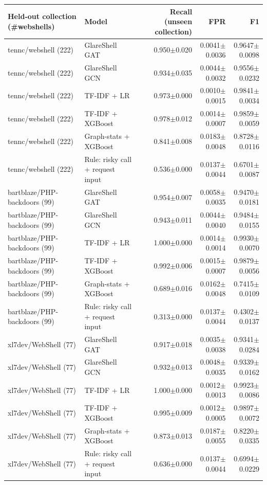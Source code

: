 \begin{tabular}{@{}llrrr@{}}
\toprule
Held-out collection (\#webshells) & Model & Recall (unseen collection) & FPR & F1 \\ \midrule
tennc/webshell (222) & GlareShell GAT & 0.950$\pm$0.020 & 0.0041$\pm$0.0036 & 0.9647$\pm$0.0098 \\
tennc/webshell (222) & GlareShell GCN & 0.934$\pm$0.035 & 0.0044$\pm$0.0032 & 0.9556$\pm$0.0232 \\
tennc/webshell (222) & TF-IDF + LR & 0.973$\pm$0.000 & 0.0010$\pm$0.0015 & 0.9841$\pm$0.0034 \\
tennc/webshell (222) & TF-IDF + XGBoost & 0.978$\pm$0.012 & 0.0014$\pm$0.0007 & 0.9859$\pm$0.0059 \\
tennc/webshell (222) & Graph-stats + XGBoost & 0.841$\pm$0.008 & 0.0183$\pm$0.0048 & 0.8728$\pm$0.0116 \\
tennc/webshell (222) & Rule: risky call + request input & 0.536$\pm$0.000 & 0.0137$\pm$0.0044 & 0.6701$\pm$0.0087 \\
bartblaze/PHP-backdoors (99) & GlareShell GAT & 0.954$\pm$0.007 & 0.0058$\pm$0.0035 & 0.9470$\pm$0.0181 \\
bartblaze/PHP-backdoors (99) & GlareShell GCN & 0.943$\pm$0.011 & 0.0044$\pm$0.0040 & 0.9484$\pm$0.0155 \\
bartblaze/PHP-backdoors (99) & TF-IDF + LR & 1.000$\pm$0.000 & 0.0014$\pm$0.0014 & 0.9930$\pm$0.0070 \\
bartblaze/PHP-backdoors (99) & TF-IDF + XGBoost & 0.992$\pm$0.006 & 0.0015$\pm$0.0007 & 0.9879$\pm$0.0056 \\
bartblaze/PHP-backdoors (99) & Graph-stats + XGBoost & 0.689$\pm$0.016 & 0.0162$\pm$0.0048 & 0.7415$\pm$0.0109 \\
bartblaze/PHP-backdoors (99) & Rule: risky call + request input & 0.313$\pm$0.000 & 0.0137$\pm$0.0044 & 0.4302$\pm$0.0137 \\
xl7dev/WebShell (77) & GlareShell GAT & 0.917$\pm$0.018 & 0.0035$\pm$0.0038 & 0.9341$\pm$0.0284 \\
xl7dev/WebShell (77) & GlareShell GCN & 0.932$\pm$0.013 & 0.0048$\pm$0.0035 & 0.9339$\pm$0.0162 \\
xl7dev/WebShell (77) & TF-IDF + LR & 1.000$\pm$0.000 & 0.0012$\pm$0.0013 & 0.9923$\pm$0.0086 \\
xl7dev/WebShell (77) & TF-IDF + XGBoost & 0.995$\pm$0.009 & 0.0012$\pm$0.0005 & 0.9897$\pm$0.0072 \\
xl7dev/WebShell (77) & Graph-stats + XGBoost & 0.873$\pm$0.013 & 0.0187$\pm$0.0055 & 0.8220$\pm$0.0335 \\
xl7dev/WebShell (77) & Rule: risky call + request input & 0.636$\pm$0.000 & 0.0137$\pm$0.0044 & 0.6994$\pm$0.0229 \\
\bottomrule
\end{tabular}
